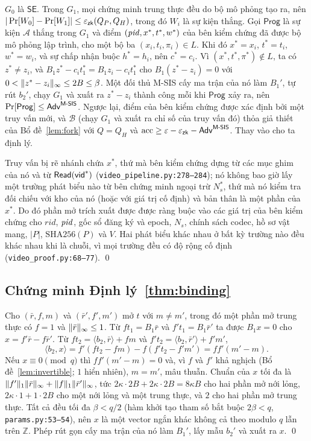 $G_0$ là $\mathsf{SE}$. Trong $G_1$, mọi chứng minh trung thực đều do bộ mô
phỏng tạo ra, nên $|\Pr[W_0]-\Pr[W_1]|\le\varepsilon_{\mathsf{zk}}(Q_P,Q_H)$, trong đó $W_i$ là sự
kiện thắng. Gọi $\mathsf{Prog}$ là sự kiện $\mathcal A$ thắng trong $G_1$ và
điểm $(\mathit{pid},x^*,t^*,w^*)$ của bên kiểm chứng đã được bộ mô phỏng lập trình, cho
một bộ ba $(x_i,t_i,\pi_i)\in L$. Khi đó $x^*=x_i$, $t^*=t_i$, $w^*=w_i$, và
sự chấp nhận buộc $h^*=h_i$, nên $c^*=c_i$. Vì $(x^*,t^*,\pi^*)\notin L$, ta
có $z^*\neq z_i$, và $B_1z^*-c_it_1^*=B_1z_i-c_it_1^*$ cho
$B_1(z^*-z_i)=0$ với $0<\lVert z^*-z_i \rVert_\infty\le2B\le\beta$. Một đối thủ M-SIS
cấy ma trận của nó làm $B_1'$, tự rút $b_2'$, chạy $G_1$ và xuất ra $z^*-z_i$
thành công mỗi khi $\mathsf{Prog}$ xảy ra, nên
$\Pr[\mathsf{Prog}]\le\mathsf{Adv}^{\textsf{M-SIS}}$. Ngược lại, điểm của bên kiểm chứng được
xác định bởi một truy vấn mới, và $\mathcal B$ (chạy $G_1$ và xuất ra chỉ số
của truy vấn đó) thỏa giả thiết của Bổ đề~\ref{lem:fork} với
$Q=Q_H$ và $\mathrm{acc}\ge\varepsilon-\varepsilon_{\mathsf{zk}}-\mathsf{Adv}^{\textsf{M-SIS}}$. Thay vào cho ta
định lý.

Truy vấn bị rẽ nhánh chứa $x^*$, thứ mà bên kiểm chứng dựng từ các mục ghim của
nó và từ $\mathsf{Read}(\mathsf{vid}^*)$ (\texttt{video\_pipeline.py:278--284}); nó
không bao giờ lấy một trường phát biểu nào từ bên chứng minh ngoại trừ $N_s^*$,
thứ mà nó kiểm tra đối chiếu với kho của nó (hoặc với giá trị cố định) và bản
thân là một phần của $x^*$. Do đó phần mở trích xuất được được ràng buộc vào các
giá trị của bên kiểm chứng cho $\mathit{rid}$, $\mathit{pid}$, gốc sổ đăng ký và epoch,
$N_s$, chính sách codec, hồ sơ vật mang, $|P|$, $\mathrm{SHA256}(P)$ và $V$. Hai
phát biểu khác nhau ở bất kỳ trường nào đều khác nhau khi là chuỗi, vì mọi
trường đều có độ rộng cố định (\texttt{video\_proof.py:68--77}). \qed

\subsection{Chứng minh Định lý~\ref{thm:binding}}

Cho $(\bar r,f,m)$ và $(\bar r',f',m')$ mở $t$ với $m\neq m'$, trong đó một
phần mở trung thực có $f=1$ và $\lVert \bar r \rVert_\infty\le1$. Từ $ft_1=B_1\bar r$
và $f't_1=B_1\bar r'$ ta được $B_1x=0$ cho $x=f'\bar r-f\bar r'$. Từ
$ft_2=\langle b_2,\bar r\rangle+fm$ và $f't_2=\langle b_2,\bar r'\rangle+f'm'$,
\[
\langle b_2,x\rangle=f'(ft_2-fm)-f(f't_2-f'm')=ff'(m'-m).
\]
Nếu $x\equiv0\pmod q$ thì $ff'(m'-m)=0$ và, vì $f$ và $f'$ khả nghịch
(Bổ đề~\ref{lem:invertible}; $1$ hiển nhiên), $m=m'$, mâu thuẫn. Chuẩn
của $x$ tối đa là $\lVert f' \rVert_1\lVert \bar r \rVert_\infty+\lVert f \rVert_1\lVert \bar r' \rVert_\infty$,
tức $2\kappa\cdot2B+2\kappa\cdot2B=8\kappa B$ cho hai phần mở nới lỏng,
$2\kappa\cdot1+1\cdot2B$ cho một nới lỏng và một trung thực, và $2$ cho hai phần
mở trung thực. Tất cả đều tối đa $\beta<q/2$ (hàm khởi tạo tham số bắt buộc
$2\beta<q$, \texttt{params.py:53--54}), nên $x$ là một vector ngắn khác không
cả theo modulo $q$ lẫn trên $\mathbb Z$. Phép rút gọn cấy ma trận của nó làm
$B_1'$, lấy mẫu $b_2'$ và xuất ra $x$. \qed

